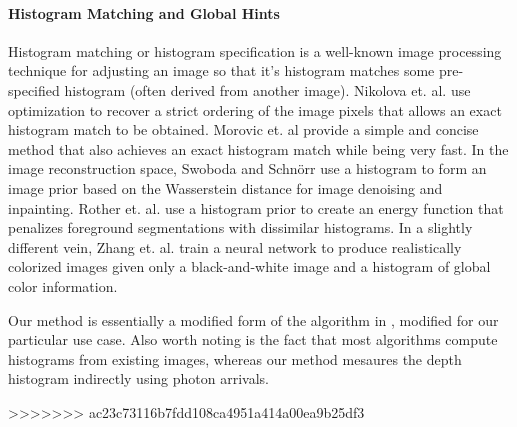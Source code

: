 %

\paragraph{Histogram Matching and Global Hints}
Histogram matching or histogram specification is a well-known image processing
technique \cite{Gonzalez2008} for adjusting an image so that it's histogram
matches some pre-specified histogram (often derived from another image).
Nikolova et. al. \cite{Nikolova2013} use optimization to recover a strict
ordering of the image pixels that allows an exact histogram match to be
obtained. Morovic et. al \cite{Morovic2002} provide a simple and concise method
that also achieves an exact histogram match while being very fast.
In the image reconstruction space, Swoboda and Schnörr \cite{Swoboda2013} use a
histogram to form an image prior based on the Wasserstein distance for image
denoising and inpainting. Rother et. al. \cite{Rother2006} use a histogram prior
to create an energy function that penalizes foreground segmentations with
dissimilar histograms. In a slightly different vein, Zhang et. al.
\cite{Zhang2017} train a neural network to produce realistically colorized
images given only a black-and-white image and a histogram of global color information.

Our method is essentially a modified form of the algorithm in
\cite{Morovic2002}, modified for our particular use case. Also worth noting is
the fact that most algorithms compute histograms from existing images, whereas
our method mesaures the depth histogram indirectly using photon arrivals.
%

>>>>>>> ac23c73116b7fdd108ca4951a414a00ea9b25df3

